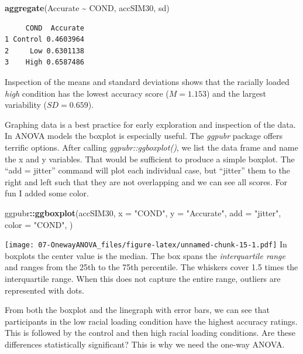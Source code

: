 \documentclass[
  11pt,
]{book}
\newenvironment{Shaded}{\begin{snugshade}}{\end{snugshade}}
\newcommand{\AttributeTok}[1]{\textcolor[rgb]{0.27,0.27,0.27}{#1}}
\newcommand{\FunctionTok}[1]{\textcolor[rgb]{0.27,0.27,0.27}{\textbf{#1}}}
\newcommand{\NormalTok}[1]{#1}
\newcommand{\SpecialCharTok}[1]{\textcolor[rgb]{0.43,0.43,0.43}{\textbf{#1}}}
\newcommand{\StringTok}[1]{\textcolor[rgb]{0.5,0.5,0.5}{#1}}
\begin{document}
\begin{Shaded}
\begin{Highlighting}[]
\FunctionTok{aggregate}\NormalTok{(Accurate }\SpecialCharTok{\textasciitilde{}}\NormalTok{ COND, accSIM30, sd)}
\end{Highlighting}
\end{Shaded}

\begin{verbatim}
     COND  Accurate
1 Control 0.4603964
2     Low 0.6301138
3    High 0.6587486
\end{verbatim}

Inspection of the means and standard deviations shows that the racially loaded \emph{high} condition has the lowest accuracy score (\(M = 1.153\)) and the largest variability (\(SD = 0.659\)).

Graphing data is a best practice for early exploration and inspection of the data. In ANOVA models the boxplot is especially useful. The \emph{ggpubr} package offers terrific options. After calling \emph{ggpubr::ggboxplot()}, we list the data frame and name the x and y variables. That would be sufficient to produce a simple boxplot. The ``add = jitter'' command will plot each individual case, but ``jitter'' them to the right and left such that they are not overlapping and we can see all scores. For fun I added some color.

\begin{Shaded}
\begin{Highlighting}[]
\NormalTok{ggpubr}\SpecialCharTok{::}\FunctionTok{ggboxplot}\NormalTok{(accSIM30, }\AttributeTok{x =} \StringTok{"COND"}\NormalTok{, }\AttributeTok{y =} \StringTok{"Accurate"}\NormalTok{, }\AttributeTok{add =} \StringTok{"jitter"}\NormalTok{,}
    \AttributeTok{color =} \StringTok{"COND"}\NormalTok{, )}
\end{Highlighting}
\end{Shaded}

\texttt{[image: 07-OnewayANOVA\_files/figure-latex/unnamed-chunk-15-1.pdf]} In boxplots the center value is the median. The box spans the \emph{interquartile range} and ranges from the 25th to the 75th percentile. The whiskers cover 1.5 times the interquartile range. When this does not capture the entire range, outliers are represented with dots.

From both the boxplot and the linegraph with error bars, we can see that participants in the low racial loading condition have the highest accuracy ratings. This is followed by the control and then high racial loading conditions. Are these differences statistically significant? This is why we need the one-way ANOVA.
\end{document}
